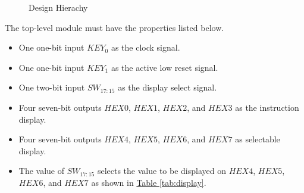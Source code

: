 \begin{figure}[htbp]
\begin{center}
    \end{center}
    \caption{Design Hierachy \label{fig:hierarchy}}
\end{figure}

The top-level module must have the properties listed below.

\begin{itemize}
    \item One one-bit input $KEY_0$ as the clock signal.
    \item One one-bit input $KEY_1$ as the active low reset signal.
    \item One two-bit input $SW_{17:15}$ as the display select signal.
    \item Four seven-bit outputs $HEX0$, $HEX1$, $HEX2$, and $HEX3$ as the instruction display.
    \item Four seven-bit outputs $HEX4$, $HEX5$, $HEX6$, and $HEX7$ as selectable display.
    \item The value of $SW_{17:15}$ selects the value to be displayed on $HEX4$, $HEX5$, $HEX6$, and $HEX7$ as shown in
    \hyperref[tab:display]{Table \ref*{tab:display}}.
\end{itemize}

